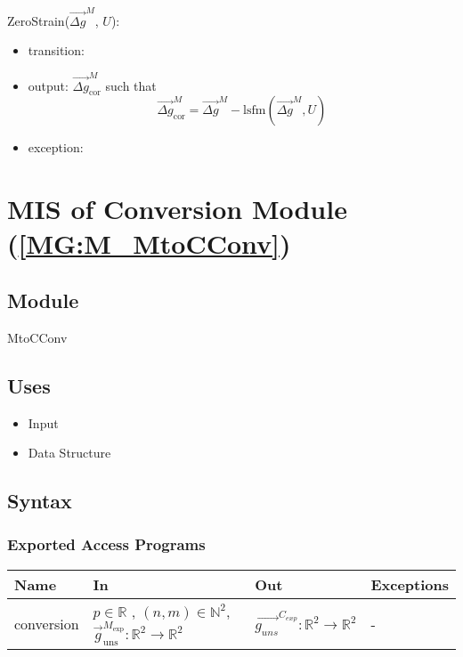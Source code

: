 \documentclass[12pt, titlepage]{article}
\begin{document}
\noindent ZeroStrain($\overrightarrow{\Delta g}^M$, $U$):
\begin{itemize}
\item transition:  
\item output: $\overrightarrow{\Delta g}_{\text{cor}}^M$ such that
\begin{equation*}
\overrightarrow{\Delta g}_{\text{cor}}^M = \overrightarrow{\Delta g}^M - \text{lsfm}(\overrightarrow{\Delta g}^M,U)
\end{equation*}
\item exception: 
\end{itemize}

\section{MIS of Conversion Module (\texorpdfstring{\cref{MG:M_MtoCConv}}))} \label{MIS_MtoCConv}

\subsection{Module}
MtoCConv
\subsection{Uses}
\begin{itemize}
\item Input
\item Data Structure
\end{itemize}

\subsection{Syntax}

\subsubsection{Exported Access Programs}

\begin{center}
\begin{tabular}{p{2cm} p{4cm} p{4cm} p{2cm}}
\hline
\textbf{Name} & \textbf{In} & \textbf{Out} & \textbf{Exceptions} \\
\hline
conversion & $p \in \mathbb{R}$ , $(n,m) \in \mathbb{N}^2$, $\overrightarrow{g}_{\text{uns}}^{M_{\text{exp}}}:\mathbb{R}^2\rightarrow\mathbb{R}^2$ & $\overrightarrow{g_{uns}}^{C_{exp}}:\mathbb{R}^2\rightarrow\mathbb{R}^2$ & - \\
\hline
\end{tabular}
\end{center}
\end{document}
